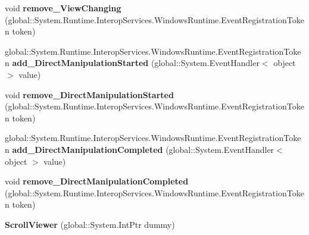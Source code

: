 \begin{DoxyCompactItemize}
\mbox{\label{class_windows_1_1_u_i_1_1_xaml_1_1_controls_1_1_scroll_viewer_a4ab42f006f295d28bd3080f99f149352}} 
void {\bfseries remove\+\_\+\+View\+Changing} (global\+::\+System.\+Runtime.\+Interop\+Services.\+Windows\+Runtime.\+Event\+Registration\+Token token)
\item 
\mbox{\label{class_windows_1_1_u_i_1_1_xaml_1_1_controls_1_1_scroll_viewer_adab47141d357f03365676f3c0dc8360c}} 
global\+::\+System.\+Runtime.\+Interop\+Services.\+Windows\+Runtime.\+Event\+Registration\+Token {\bfseries add\+\_\+\+Direct\+Manipulation\+Started} (global\+::\+System.\+Event\+Handler$<$ object $>$ value)
\item 
\mbox{\label{class_windows_1_1_u_i_1_1_xaml_1_1_controls_1_1_scroll_viewer_a34f553f86c580da23d4109f5e64d47bc}} 
void {\bfseries remove\+\_\+\+Direct\+Manipulation\+Started} (global\+::\+System.\+Runtime.\+Interop\+Services.\+Windows\+Runtime.\+Event\+Registration\+Token token)
\item 
\mbox{\label{class_windows_1_1_u_i_1_1_xaml_1_1_controls_1_1_scroll_viewer_a5700eed19403dac498a6b0e4c2164043}} 
global\+::\+System.\+Runtime.\+Interop\+Services.\+Windows\+Runtime.\+Event\+Registration\+Token {\bfseries add\+\_\+\+Direct\+Manipulation\+Completed} (global\+::\+System.\+Event\+Handler$<$ object $>$ value)
\item 
\mbox{\label{class_windows_1_1_u_i_1_1_xaml_1_1_controls_1_1_scroll_viewer_abfd26932c4679f145e20ab03785ea8be}} 
void {\bfseries remove\+\_\+\+Direct\+Manipulation\+Completed} (global\+::\+System.\+Runtime.\+Interop\+Services.\+Windows\+Runtime.\+Event\+Registration\+Token token)
\item 
\mbox{\label{class_windows_1_1_u_i_1_1_xaml_1_1_controls_1_1_scroll_viewer_ae43835a1ae5cf186b95dbddb1dec3e35}} 
{\bfseries Scroll\+Viewer} (global\+::\+System.\+Int\+Ptr dummy)
\item 
\mbox{\label{class_windows_1_1_u_i_1_1_xaml_1_1_controls_1_1_scroll_viewer_ae2150cc90ac054e44b19688d45254504}} 

\end{DoxyCompactItemize}
